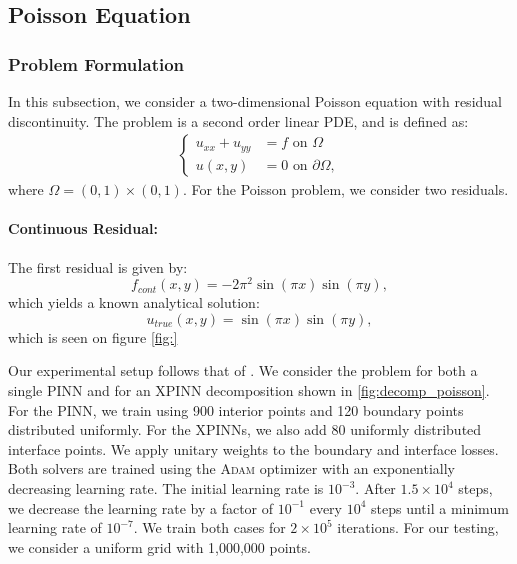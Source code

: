 \subsection{Poisson Equation}
\subsubsection{Problem Formulation}
In this subsection, we consider a two-dimensional Poisson equation with residual discontinuity. The problem is a second order linear PDE, and is defined as:
\begin{align}\label{eq:poisson}
\begin{cases}
    u_{xx}+u_{yy} &= f \text{ on } \Omega \\
    u(x,y) &= 0 \text{ on } \partial\Omega,
\end{cases}
\end{align}
where $\Omega = (0,1) \times (0,1)$. For the Poisson problem, we consider two residuals. 
\paragraph{Continuous Residual:}
The first residual is given by:
\begin{equation}
    f_{cont}(x,y)= -2\pi^2\sin(\pi x) \sin(\pi y),
    \label{eq:continuous_poisson}
\end{equation}
which yields a known analytical solution:
\begin{equation*}
    u_{true}(x,y)=\sin(\pi x) \sin(\pi y),
\end{equation*}
which is seen on figure \ref{fig:}

Our experimental setup follows that of \textcite{müller2023achieving}.
We consider the problem for both a single PINN and for an XPINN decomposition shown in \autoref{fig:decomp_poisson}.
For the PINN, we train using 900 interior points and 120 boundary points distributed uniformly.
For the XPINNs, we also add 80 uniformly distributed interface points. We apply unitary weights to the boundary and interface losses.
Both solvers are trained using the \textsc{Adam} optimizer with an exponentially decreasing learning rate.
The initial learning rate is $10^{-3}$.
After $1.5\times 10^4$ steps, we decrease the learning rate by a factor of $10^{-1}$ every $10^4$ steps until a minimum learning rate of $10^{-7}$.
We train both cases for $2\times 10^5$ iterations. For our testing, we consider a uniform grid with 1,000,000 points. 


